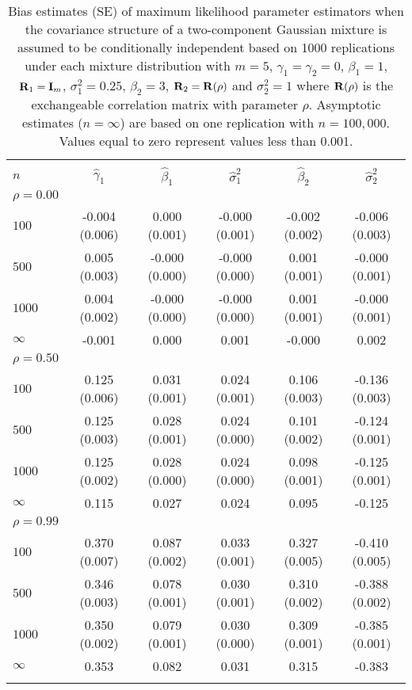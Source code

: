\begin{table}[ht]
\begin{center}
\begin{tabular}{lccccc}
   \thickhline \multicolumn{6}{c}{\textbf{Bias Estimates}}\\ $n$ & $\widehat{\gamma}_1$ & $\widehat{\beta}_1$ & $\widehat{\sigma}^2_1$ & $\widehat{\beta}_2$ & $\widehat{\sigma}^2_2$\\ 
   \hline$\rho=0.00$\\
    $100$ & -0.004 (0.006) & 0.000 (0.001) & -0.000 (0.001) & -0.002 (0.002) & -0.006 (0.003)\\ 
    $500$ & 0.005 (0.003) & -0.000 (0.000) & -0.000 (0.000) & 0.001 (0.001) & -0.000 (0.001)\\ 
    $1000$ & 0.004 (0.002) & -0.000 (0.000) & -0.000 (0.000) & 0.001 (0.001) & -0.000 (0.001)\\ 
    $\infty$ & -0.001 & 0.000 & 0.001 & -0.000 & 0.002\\ 
  $\rho = 0.50$\\
   $100$ & 0.125 (0.006) & 0.031 (0.001) & 0.024 (0.001) & 0.106 (0.003) & -0.136 (0.003)\\ 
    $500$ & 0.125 (0.003) & 0.028 (0.001) & 0.024 (0.000) & 0.101 (0.002) & -0.124 (0.001)\\ 
    $1000$ & 0.125 (0.002) & 0.028 (0.000) & 0.024 (0.000) & 0.098 (0.001) & -0.125 (0.001)\\ 
   $\infty$ & 0.115 & 0.027 & 0.024 & 0.095 & -0.125\\ 
  $\rho = 0.99$\\
   $100$ & 0.370 (0.007) & 0.087 (0.002) & 0.033 (0.001) & 0.327 (0.005) & -0.410 (0.005)\\ 
   $500$ & 0.346 (0.003) & 0.078 (0.001) & 0.030 (0.001) & 0.310 (0.002) & -0.388 (0.002)\\ 
   $1000$ & 0.350 (0.002) & 0.079 (0.001) & 0.030 (0.000) & 0.309 (0.001) & -0.385 (0.001)\\ 
   $\infty$ & 0.353 & 0.082 & 0.031 & 0.315 & -0.383 \\ 
   \thickhline\end{tabular}
\caption{Bias estimates (SE) of maximum likelihood parameter estimators when the covariance structure of a two-component Gaussian mixture is assumed to be conditionally independent based on 1000 replications under each mixture distribution with $m=5$, $\gamma_1=\gamma_2=0$, $\beta_{1}=1$, $\mathbf R_1=\mathbf I_{m}$, $\sigma_1^{2}=0.25$, $\beta_2=3$, $\mathbf R_2=\mathbf R(\rho)$ and $\sigma_2^{2}=1$ where $\mathbf R(\rho)$ is the exchangeable correlation matrix with parameter $\rho$. Asymptotic estimates ($n=\infty$) are based on one replication with $n=100,000$. Values equal to zero represent values less than 0.001.}
\label{tab:dep1}
\end{center}
\end{table}
